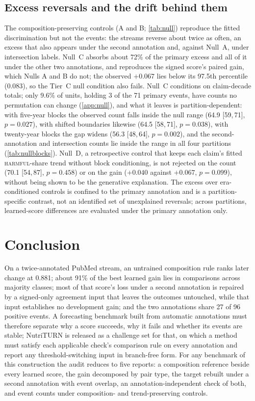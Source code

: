 \documentclass[11pt]{article}
\newcommand{\method}{NutriTURN\xspace}
\newcommand{\ci}[2]{[#1,\,#2]}
\begin{document}
\subsection{Excess reversals and the drift behind them}
\label{sec:null}
The composition-preserving controls (A and B; \cref{tab:null}) reproduce the fitted
discrimination but not the events: the streams reverse
about twice as often, an excess that also appears under the second annotation and, against Null~A,
under intersection labels. Null~C absorbs about 72\% of the primary excess and all of it under the
other two annotations, and reproduces the signed score's paired gain, which Nulls A and B do not;
the observed $+0.067$ lies below its 97.5th percentile (0.083), so the Tier~C null condition also
fails. Null~C conditions on claim-decade totals; only 9.6\% of units, holding 3 of the 71
primary events, have counts no permutation can change (\cref{app:null}), and what it leaves is
partition-dependent: with five-year blocks the
observed count falls inside the null range (64.9 \ci{59}{71}, $p=0.027$), with shifted boundaries
likewise (64.5 \ci{58}{71}, $p=0.038$), with twenty-year blocks the gap widens (56.3 \ci{48}{64},
$p=0.002$), and the second-annotation and intersection counts lie inside the range in all four
partitions (\cref{tab:nullblocks}). Null~D, a retrospective control that keeps each claim's fitted
\textsc{harmful}-share trend without block conditioning, is not rejected on the count (70.1
\ci{54}{87}, $p=0.458$) or on the gain ($+0.040$ against $+0.067$, $p=0.099$), without being shown to be
the generative explanation. The excess over era-conditioned controls is confined to the primary
annotation and is a partition-specific contrast, not an identified set of unexplained reversals;
across partitions, learned-score differences are evaluated under the primary annotation only.

\section{Conclusion}
\label{sec:conclusion}
On a twice-annotated PubMed stream, an untrained composition rule ranks later change at 0.881;
about 91\% of the best learned gain lies in comparisons across majority classes; most of that
score's loss under a second annotation is repaired by a signed-only agreement input that leaves
the outcomes untouched, while that input establishes no development gain; and the two
annotations share 27 of 96 positive events. A forecasting benchmark built from automatic
annotations must therefore separate why a score succeeds, why it fails and whether its events are
stable; \method is released as a challenge set for that, on which a method must satisfy each
applicable check's comparison rule on every annotation and report any threshold-switching input in
branch-free form. For any benchmark of this construction the audit reduces to five reports: a
composition reference beside every learned score, the gain decomposed by pair type, the target
rebuilt under a second annotation with event overlap, an annotation-independent check of both, and
event counts under composition- and trend-preserving controls.
\end{document}
